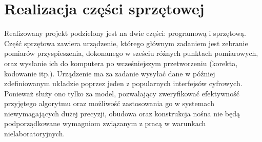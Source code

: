 \chapter{Realizacja części sprzętowej}\label{sprzet}
Realizowany projekt podzielony jest na dwie części: programową i sprzętową. Część sprzętowa zawiera urządzenie, którego głównym zadaniem jest zebranie pomiarów przyspieszenia, dokonanego w sześciu różnych punktach pomiarowych, oraz wysłanie ich do komputera po wcześniejszym przetworzeniu (korekta, kodowanie itp.). Urządzenie ma za zadanie wysyłać dane w później zdefiniowanym układzie poprzez jeden z popularnych interfejsów cyfrowych. Ponieważ służy ono tylko za model, pozwalający zweryfikować efektywność przyjętego algorytmu oraz możliwość zastosowania go w systemach niewymagających dużej precyzji, obudowa oraz konstrukcja nośna nie będą podporządkowane wymagniom związanym z pracą w warunkach nielaboratoryjnych.

